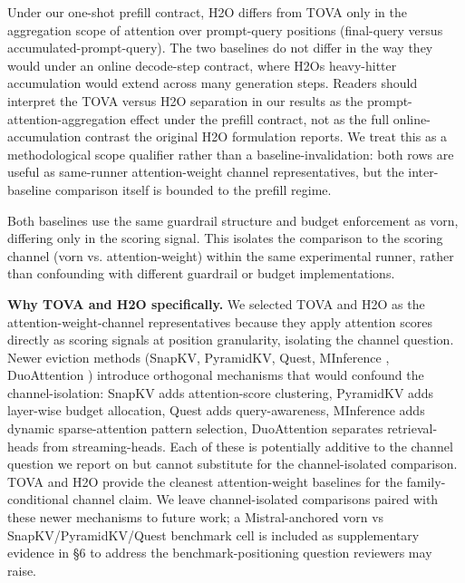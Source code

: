 \documentclass[10pt]{article}
\begin{document}
Under our one-shot prefill contract, H2O differs from TOVA
only in the aggregation scope of attention over prompt-query positions
(final-query versus accumulated-prompt-query). The two baselines do not
differ in the way they would under an online decode-step contract, where
H2O\textquotesingle s heavy-hitter accumulation would extend across many
generation steps. Readers should interpret the TOVA versus
H2O separation in our results as the prompt-attention-aggregation
effect under the prefill contract, not as the full online-accumulation
contrast the original H2O formulation reports. We treat this as a
methodological scope qualifier rather than a baseline-invalidation: both
rows are useful as same-runner attention-weight channel representatives,
but the inter-baseline comparison itself is bounded to the prefill
regime.

Both baselines use the same guardrail structure and budget enforcement
as vorn, differing only in the scoring signal. This isolates the
comparison to the scoring channel (vorn vs.
attention-weight) within the same experimental runner, rather than
confounding with different guardrail or budget implementations.

\textbf{Why TOVA and H2O specifically.} We selected TOVA and
H2O as the attention-weight-channel representatives because they
apply attention scores directly as scoring signals at position
granularity, isolating the channel question. Newer eviction methods
(SnapKV, PyramidKV, Quest, MInference
\citep{jiang2024minference}, DuoAttention
\citep{xiao2024duoattention}) introduce orthogonal
mechanisms that would confound the channel-isolation: SnapKV adds
attention-score clustering, PyramidKV adds layer-wise budget allocation,
Quest adds query-awareness, MInference adds dynamic sparse-attention
pattern selection, DuoAttention separates retrieval-heads from
streaming-heads. Each of these is potentially additive to the channel
question we report on but cannot substitute for the channel-isolated
comparison. TOVA and H2O provide the cleanest
attention-weight baselines for the family-conditional channel claim. We
leave channel-isolated comparisons paired with these newer mechanisms to
future work; a Mistral-anchored vorn vs SnapKV/PyramidKV/Quest benchmark
cell is included as supplementary evidence in \S{}6 to address the
benchmark-positioning question reviewers may raise.
\end{document}
